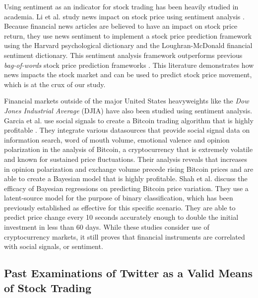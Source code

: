 \documentclass[../thesis.tex]{subfiles}
\begin{document}
Using sentiment as an indicator for stock trading has been heavily studied in academia. Li et al. study news impact on stock price using sentiment analysis \cite{Li2014}. Because financial news articles are believed to have an impact on stock price return, they use news sentiment to implement a stock price prediction framework using the Harvard psychological dictionary and the Loughran-McDonald financial sentiment dictionary. This sentiment analysis framework outperforms previous \textit{bag-of-words} stock price prediction frameworks  \cite{Li2014}. This literature demonstrates how news impacts the stock market and can be used to predict stock price movement, which is at the crux of our study. 

Financial markets outside of the major United States heavyweights like the \textit{Dow Jones Industrial Average} (DJIA) have also been studied using sentiment analysis. Garcia et al. use social signals to create a Bitcoin trading algorithm that is highly profitable \cite{Garcia2015}. They integrate various datasources that provide social signal data on information search, word of mouth volume, emotional valence and opinion polarization in the analysis of Bitcoin, a cryptocurrency that is extremely volatile and known for sustained price fluctuations. Their analysis reveals that increases in opinion polarization and exchange volume precede rising Bitcoin prices and are able to create a Bayesian model that is highly profitable. Shah et al. \cite{Shah2014} discuss the efficacy of Bayesian regressions on predicting Bitcoin price variation. They use a latent-source model for the purpose of binary classification, which has been previously established as effective for this specific scenario. They are able to predict price change every 10 seconds accurately enough to double the initial investment in less than 60 days. While these studies consider use of cryptocurrency markets, it still proves that financial instruments are correlated with social signals, or sentiment.  

\subsection{Past Examinations of Twitter as a Valid Means of Stock Trading}
\end{document}
